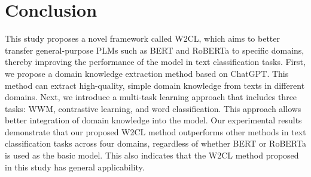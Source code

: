\section{Conclusion}
\label{sec:con}
This study proposes a novel framework called W2CL, which aims to better transfer general-purpose PLMs such as BERT and RoBERTa to specific domains, thereby improving the performance of the model in text classification tasks. First, we propose a domain knowledge extraction method based on ChatGPT. This method can extract high-quality, simple domain knowledge from texts in different domains. Next, we introduce a multi-task learning approach that includes three tasks: WWM, contrastive learning, and word classification. This approach allows better integration of domain knowledge into the model. Our experimental results demonstrate that our proposed W2CL method outperforms other methods in text classification tasks across four domains, regardless of whether BERT or RoBERTa is used as the basic model. This also indicates that the W2CL method proposed in this study has general applicability.
